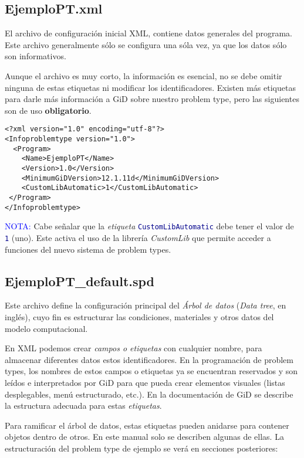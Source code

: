 \documentclass[10pt, a4paper, twocolumn]{article} %
\begin{document}
\subsection{EjemploPT.xml}\label{sec:codigoXML}

El archivo de configuración inicial XML, contiene datos generales del programa. Este archivo generalmente sólo se configura una sóla vez, ya que los datos sólo son informativos.

Aunque el archivo es muy corto, la información es esencial, no se debe omitir ninguna de estas etiquetas ni modificar los identificadores. Existen más etiquetas para darle más información a GiD sobre nuestro problem type, pero las siguientes son de uso \textbf{obligatorio}.

\lstset{language=XML} 
\begin{lstlisting}
<?xml version="1.0" encoding="utf-8"?>
<Infoproblemtype version="1.0">
  <Program>
    <Name>EjemploPT</Name>
    <Version>1.0</Version>   
    <MinimumGiDVersion>12.1.11d</MinimumGiDVersion>
    <CustomLibAutomatic>1</CustomLibAutomatic>
 </Program>
</Infoproblemtype>
\end{lstlisting}

\textcolor{blue}{NOTA:} Cabe señalar que la \textit{etiqueta} \texttt{\textcolor{darkblue}{CustomLibAutomatic}} debe tener el valor de \texttt{\textcolor{darkblue}{1}} (uno). Este activa el uso de la librería \textit{CustomLib} que permite acceder a funciones del nuevo sistema de problem types.

\subsection{EjemploPT\_default.spd}

Este archivo define la configuración principal del \textit{Árbol de datos} (\textit{Data tree}, en inglés), cuyo fin es estructurar las condiciones, materiales y otros datos del modelo computacional.

En XML podemos crear \textit{campos o etiquetas} con cualquier nombre, para almacenar diferentes datos estos identificadores. En la programación de problem types, los nombres de estos campos o etiquetas ya se encuentran reservados y son leídos e interpretados por GiD para que pueda crear elementos visuales (listas desplegables, menú estructurado, etc.). En la documentación de GiD se describe la estructura adecuada para estas \textit{etiquetas}.

Para ramificar el árbol de datos, estas etiquetas pueden anidarse para contener objetos dentro de otros. En este manual solo se describen algunas de ellas. La estructuración del problem type de ejemplo se verá en secciones posteriores:
\end{document}
